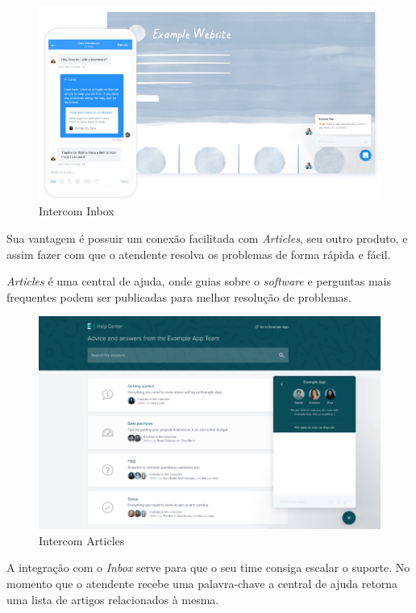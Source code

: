 \begin{figure}[ht!]
	\centering
		\includegraphics[scale=0.4]{figures/intercom-inbox.jpg} 
	\caption{Intercom Inbox}
	\label{fig:intercom_inbox}
\end{figure}

Sua vantagem é possuir um conexão facilitada com \textit{Articles}, seu outro produto, e assim fazer com que o atendente resolva os problemas de forma rápida e fácil.

\textit{Articles} é uma central de ajuda, onde guias sobre o \textit{software} e perguntas mais frequentes podem ser publicadas para melhor resolução de problemas. 

\begin{figure}[ht!]
	\centering 
		\includegraphics[scale=0.4]{figures/intercom-articles.jpg} 
	\caption{Intercom Articles}
	\label{fig:intercom_articles}
\end{figure}

A integração com o \textit{Inbox} serve para que o seu time consiga escalar o suporte. No momento que o atendente recebe uma palavra-chave a central de ajuda retorna uma lista de artigos relacionados à mesma. 

